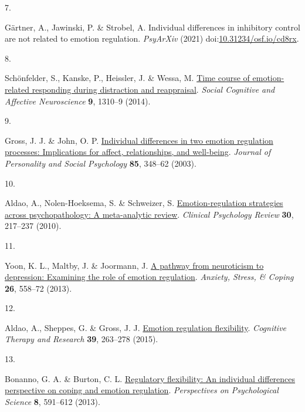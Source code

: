 \documentclass[
  man,floatsintext]{apa6}
\newlength{\cslhangindent}
\newlength{\csllabelwidth}
\newlength{\cslentryspacingunit} %
\newenvironment{CSLReferences}[2] %
 {%
  \setlength{\parindent}{0pt}
  \ifodd #1
  \let\oldpar\par
  \def\par{\hangindent=\cslhangindent\oldpar}
  \fi
  \setlength{\parskip}{#2\cslentryspacingunit}
 }%
 {}
\newcommand{\CSLLeftMargin}[1]{\parbox[t]{\csllabelwidth}{#1}}
\newcommand{\CSLRightInline}[1]{\parbox[t]{\linewidth - \csllabelwidth}{#1}\break}
\begin{document}
\begin{CSLReferences}{0}{0}
\leavevmode{}%
\CSLLeftMargin{7. }%
\CSLRightInline{Gärtner, A., Jawinski, P. \& Strobel, A. Individual differences in inhibitory control are not related to emotion regulation. \emph{PsyArXiv} (2021) doi:\href{https://doi.org/10.31234/osf.io/cd8rx}{10.31234/osf.io/cd8rx}.}

\leavevmode{}%
\CSLLeftMargin{8. }%
\CSLRightInline{Schönfelder, S., Kanske, P., Heissler, J. \& Wessa, M. \href{https://doi.org/10.1093/scan/nst116}{Time course of emotion-related responding during distraction and reappraisal}. \emph{Social Cognitive and Affective Neuroscience} \textbf{9}, 1310--9 (2014).}

\leavevmode{}%
\CSLLeftMargin{9. }%
\CSLRightInline{Gross, J. J. \& John, O. P. \href{https://doi.org/10.1037/0022-3514.85.2.348}{Individual differences in two emotion regulation processes: Implications for affect, relationships, and well-being}. \emph{Journal of Personality and Social Psychology} \textbf{85}, 348--62 (2003).}

\leavevmode{}%
\CSLLeftMargin{10. }%
\CSLRightInline{Aldao, A., Nolen-Hoeksema, S. \& Schweizer, S. \href{https://doi.org/10.1016/j.cpr.2009.11.004}{Emotion-regulation strategies across psychopathology: A meta-analytic review}. \emph{Clinical Psychology Review} \textbf{30}, 217--237 (2010).}

\leavevmode{}%
\CSLLeftMargin{11. }%
\CSLRightInline{Yoon, K. L., Maltby, J. \& Joormann, J. \href{https://doi.org/10.1080/10615806.2012.734810}{A pathway from neuroticism to depression: Examining the role of emotion regulation}. \emph{Anxiety, Stress, \& Coping} \textbf{26}, 558--72 (2013).}

\leavevmode{}%
\CSLLeftMargin{12. }%
\CSLRightInline{Aldao, A., Sheppes, G. \& Gross, J. J. \href{https://doi.org/10.1007/s10608-014-9662-4}{Emotion regulation flexibility}. \emph{Cognitive Therapy and Research} \textbf{39}, 263--278 (2015).}

\leavevmode{}%
\CSLLeftMargin{13. }%
\CSLRightInline{Bonanno, G. A. \& Burton, C. L. \href{https://doi.org/10.1177/1745691613504116}{Regulatory flexibility: An individual differences perspective on coping and emotion regulation}. \emph{Perspectives on Psychological Science} \textbf{8}, 591--612 (2013).}


\end{CSLReferences}
\end{document}
